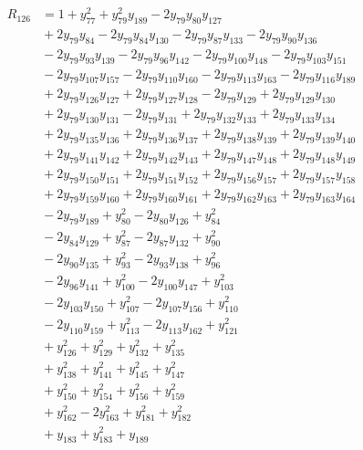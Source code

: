 \begin{align*}
R_{126} &={} 1 +y_{77}^{2} +y_{79}^{2}y_{189} -2y_{79}y_{80}y_{127} \\
 &{} +2y_{79}y_{84} -2y_{79}y_{84}y_{130} -2y_{79}y_{87}y_{133} -2y_{79}y_{90}y_{136} \\
 &{} -2y_{79}y_{93}y_{139} -2y_{79}y_{96}y_{142} -2y_{79}y_{100}y_{148} -2y_{79}y_{103}y_{151} \\
 &{} -2y_{79}y_{107}y_{157} -2y_{79}y_{110}y_{160} -2y_{79}y_{113}y_{163} -2y_{79}y_{116}y_{189} \\
 &{} +2y_{79}y_{126}y_{127} +2y_{79}y_{127}y_{128} -2y_{79}y_{129} +2y_{79}y_{129}y_{130} \\
 &{} +2y_{79}y_{130}y_{131} -2y_{79}y_{131} +2y_{79}y_{132}y_{133} +2y_{79}y_{133}y_{134} \\
 &{} +2y_{79}y_{135}y_{136} +2y_{79}y_{136}y_{137} +2y_{79}y_{138}y_{139} +2y_{79}y_{139}y_{140} \\
 &{} +2y_{79}y_{141}y_{142} +2y_{79}y_{142}y_{143} +2y_{79}y_{147}y_{148} +2y_{79}y_{148}y_{149} \\
 &{} +2y_{79}y_{150}y_{151} +2y_{79}y_{151}y_{152} +2y_{79}y_{156}y_{157} +2y_{79}y_{157}y_{158} \\
 &{} +2y_{79}y_{159}y_{160} +2y_{79}y_{160}y_{161} +2y_{79}y_{162}y_{163} +2y_{79}y_{163}y_{164} \\
 &{} -2y_{79}y_{189} +y_{80}^{2} -2y_{80}y_{126} +y_{84}^{2} \\
 &{} -2y_{84}y_{129} +y_{87}^{2} -2y_{87}y_{132} +y_{90}^{2} \\
 &{} -2y_{90}y_{135} +y_{93}^{2} -2y_{93}y_{138} +y_{96}^{2} \\
 &{} -2y_{96}y_{141} +y_{100}^{2} -2y_{100}y_{147} +y_{103}^{2} \\
 &{} -2y_{103}y_{150} +y_{107}^{2} -2y_{107}y_{156} +y_{110}^{2} \\
 &{} -2y_{110}y_{159} +y_{113}^{2} -2y_{113}y_{162} +y_{121}^{2} \\
 &{} +y_{126}^{2} +y_{129}^{2} +y_{132}^{2} +y_{135}^{2} \\
 &{} +y_{138}^{2} +y_{141}^{2} +y_{145}^{2} +y_{147}^{2} \\
 &{} +y_{150}^{2} +y_{154}^{2} +y_{156}^{2} +y_{159}^{2} \\
 &{} +y_{162}^{2} -2y_{163}^{2} +y_{181}^{2} +y_{182}^{2} \\
 &{} +y_{183} +y_{183}^{2} +y_{189}
\end{align*}
